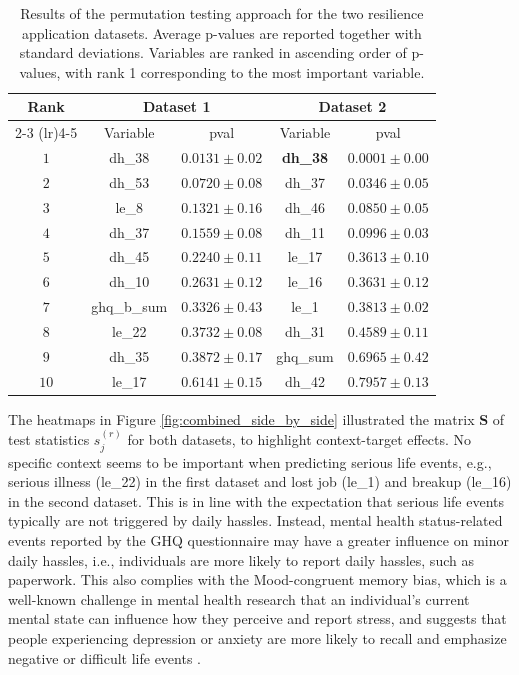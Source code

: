 \documentclass[AMA,Times1COL]{WileyNJDv5} %
\begin{document}
\begin{table}[tbp]
\centering
\caption{Results of the permutation testing approach for the two resilience application datasets. Average p-values are reported together with standard deviations. Variables are ranked in ascending order of p-values, with rank 1 corresponding to the most important variable.}
\label{tab:real_data_statistical_testing}
\renewcommand{\arraystretch}{1.2}
\footnotesize
\begin{tabular}{ccccc}
\toprule
\multirow{2}{*}{Rank} 
  & \multicolumn{2}{c}{Dataset 1} 
  & \multicolumn{2}{c}{Dataset 2} 
  \\
\cmidrule(lr){2-3} \cmidrule(lr){4-5}
& Variable & pval 
& Variable & pval 
 \\
\midrule
$1$  & dh\_38 & \(0.0131 \pm 0.02\)     & \textbf{dh\_38} & \(\mathbf{0.0001 \pm 0.00}\)\\
$2$  & dh\_53 & \(0.0720 \pm 0.08\)     & dh\_37          & \(0.0346 \pm 0.05\)         \\
$3$  & le\_8  & \(0.1321 \pm 0.16\)     & dh\_46          & \(0.0850 \pm 0.05\)         \\
$4$  & dh\_37 & \(0.1559 \pm 0.08\)     & dh\_11          & \(0.0996 \pm 0.03\)         \\
$5$  & dh\_45 & \(0.2240 \pm 0.11\)     & le\_17          & \(0.3613 \pm 0.10\)         \\
$6$  & dh\_10 & \(0.2631 \pm 0.12\)     & le\_16          & \(0.3631 \pm 0.12\)         \\
$7$  & ghq\_b\_sum & \(0.3326 \pm 0.43\) & le\_1           & \(0.3813 \pm 0.02\)         \\
$8$  & le\_22 & \(0.3732 \pm 0.08\)     & dh\_31          & \(0.4589 \pm 0.11\)         \\
$9$  & dh\_35 & \(0.3872 \pm 0.17\)     & ghq\_sum        & \(0.6965 \pm 0.42\)         \\
$10$ & le\_17 & \(0.6141 \pm 0.15\)     & dh\_42          & \(0.7957 \pm 0.13\)         \\
\bottomrule
\end{tabular}
\end{table}

The heatmaps in Figure \ref{fig:combined_side_by_side} illustrated the matrix $\mathbf{S}$ of test statistics $s_j^{(r)}$ for both datasets, to highlight context-target effects. No specific context seems to be important when predicting serious life events, e.g., serious illness (le\_22) in the first dataset and lost job (le\_1) and breakup (le\_16) in the second dataset. This is in line with the expectation that serious life events typically are not triggered by daily hassles. 
Instead, mental health status-related events reported by the GHQ questionnaire may have a greater influence on minor daily hassles, i.e., individuals are more likely to report daily hassles, such as paperwork. This also complies with the  Mood-congruent memory bias, which is a well-known challenge in mental health research that an individual’s current mental state can influence how they perceive and report stress, and suggests that people experiencing depression or anxiety are more likely to recall and emphasize negative or difficult life events \citep{losiak_stressful_2019}. 
\end{document}
